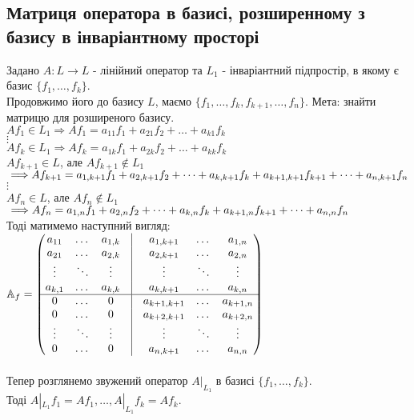 \documentclass[a4paper, 10pt]{article}
\theoremstyle{theoremdd}
\theoremstyle{theoremdd}
\theoremstyle{theoremdd}
\theoremstyle{theoremdd}
\theoremstyle{theoremdd}
\theoremstyle{theoremdd}
\theoremstyle{theoremdd}
\theoremstyle{theoremdd}
\begin{document}
\subsection{Матриця оператора в базисі, розширенному з базису в інваріантному просторі}
Задано $A: L \to L$ - лінійний оператор та $L_1$ - інваріантний підпростір, в якому є базис $\{f_1,\dots, f_k\}$.\\
Продовжимо його до базису $L$, маємо $\{f_1,\dots,f_k,f_{k+1},\dots,f_n\}$. Мета: знайти матрицю для розширеного базису.\\
$Af_1 \in L_1 \Rightarrow Af_1 = a_{11}f_1 + a_{21}f_2 + \dots + a_{k1}f_k$\\
$\vdots$\\
$Af_k \in L_1 \Rightarrow Af_k = a_{1k}f_1 + a_{2k}f_2 + \dots + a_{kk}f_k$\\
$Af_{k+1} \in L $, але $Af_{k+1} \not\in L_1$ $\implies \\ Af_{k+1} = a_{1,k+1}f_1 + a_{2,k+1}f_2 + \dots + a_{k,k+1}f_k + a_{k+1,k+1}f_{k+1} + \dots + a_{n,k+1}f_n$\\
$\vdots$\\
$Af_n \in L $, але $Af_n \not\in L_1$ $\implies \\ Af_n = a_{1,n}f_1 + a_{2,n}f_2 + \dots + a_{k,n}f_k + a_{k+1,n}f_{k+1} + \dots + a_{n,n}f_n$\\
Тоді матимемо наступний вигляд:\\
$\mathbb{A}_f = \begin{pmatrix}
a_{11} & \dots & a_{1,k} & \vline & a_{1,k+1} & \dots & a_{1, n} \\
a_{21} & \dots & a_{2,k} & \vline & a_{2,k+1} & \dots & a_{2, n} \\
\vdots & \ddots & \vdots & \vline & \vdots & \ddots & \vdots \\
a_{k,1} & \dots & a_{k,k} & \vline & a_{k,k+1} & \dots & a_{k, n} \\
\hline
0 & \dots & 0 & \vline & a_{k+1,k+1} & \dots & a_{k+1, n} \\
0 & \dots & 0 & \vline & a_{k+2,k+1} &  \dots & a_{k+2, n} \\
\vdots & \ddots & \vdots & \vline & \vdots & \ddots & \vdots \\
0 & \dots & 0 & \vline & a_{n,k+1} & \dots & a_{n, n} \\
\end{pmatrix}$\\
\\
Тепер розглянемо звужений оператор $A|_{L_1}$ в базисі $\{f_1,\dots,f_k\}$.\\ Тоді $A|_{L_1} f_1 = Af_1 , \dots, A|_{L_1}f_k = Af_k$.\\
\end{document}

